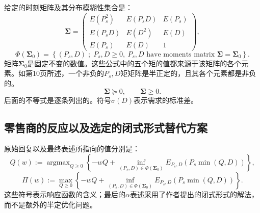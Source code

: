 \documentclass{article}
\begin{document}
给定的时刻矩阵及其分布模糊性集合是：
\[
\boldsymbol{\Sigma}=
\begin{pmatrix}
E(P_s^2)&E(P_sD)&E(P_s)\\
E(P_sD)&E(D^2)&E(D)\\
E(P_s)&E(D)&1
\end{pmatrix},
\]
\[
\Phi(\boldsymbol{\Sigma}_0)=
\left\{(P_s,D)\;;\;P_s,D\geq0,\ 
P_s,D\text{ have moments matrix }\boldsymbol{\Sigma}=\boldsymbol{\Sigma}_0\right\}.
\]
矩阵$\boldsymbol{\Sigma}_0$是固定不变的数值。这些公式中的五个矩的值都来源于该矩阵的各个元素。如第10页所述，一个非负的$P_s,D$矩矩阵是半正定的，且其各个元素都是非负的。
\[
\boldsymbol{\Sigma}\succeq0,\qquad \boldsymbol{\Sigma}\geq0.
\]
后面的不等式是逐条列出的。符号$\sigma(D)$表示需求的标准差。

\subsection*{零售商的反应以及选定的闭式形式替代方案}
原始回复以及最终表述所指向的值分别是：
\begin{equation}
Q(w):=\operatorname{argmax}_{Q\geq0}
\left\{-wQ+\inf_{(P_s,D)\in\Phi(\boldsymbol{\Sigma}_0)}
E_{P_s,D}\!\left(P_s\min(Q,D)\right)\right\},
\tag{3}
\end{equation}
\begin{equation}
\Pi(w):=\max_{Q\geq0}
\left\{-wQ+\inf_{(P_s,D)\in\Phi(\boldsymbol{\Sigma}_0)}
E_{P_s,D}\!\left(P_s\min(Q,D)\right)\right\}.
\tag{4}
\end{equation}
这些符号表示响应函数的含义；最后的$\alpha$表述采用了作者提出的闭式形式的解法，而不是额外的半定优化问题。
\end{document}
